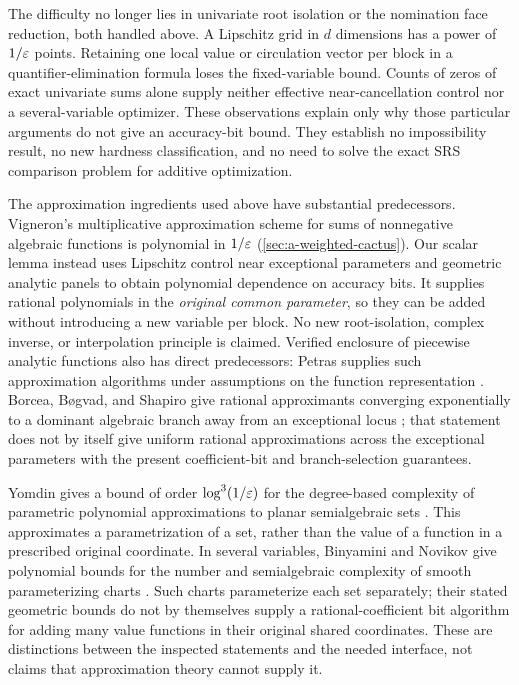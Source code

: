 The difficulty no longer lies in univariate root isolation or the
nomination face reduction, both handled above. A Lipschitz grid in $d$ dimensions
has a power of $1/\varepsilon$ points. Retaining one local value or circulation
vector per block in a quantifier-elimination formula loses the
fixed-variable bound. Counts of zeros of exact univariate sums alone
supply neither effective near-cancellation control nor a
several-variable optimizer. These observations explain only why those
particular arguments do not give an accuracy-bit bound. They establish
no impossibility result, no new hardness classification, and no need
to solve the exact SRS comparison problem for additive optimization.

The approximation ingredients used above have substantial predecessors.
Vigneron's multiplicative approximation scheme for sums of nonnegative
algebraic functions \citep{vigneron2014-geometric-optimization-and-sums-of}
is polynomial in $1/\varepsilon$ (\cref{sec:a-weighted-cactus}). Our scalar lemma
instead uses Lipschitz control near exceptional parameters and geometric
analytic panels to obtain polynomial dependence on accuracy bits. It
supplies rational polynomials in the \emph{original common parameter},
so they can be added without introducing a new variable per block.
No new root-isolation, complex inverse, or interpolation principle is
claimed. Verified enclosure of piecewise analytic functions also has
direct predecessors: Petras supplies such approximation algorithms under
assumptions on the function representation \citep{petras2002-approximation}.
Borcea, B\o gvad, and Shapiro give rational approximants converging
exponentially to a dominant algebraic branch away from an exceptional
locus \citep[Theorems~2--3]{borcea2006-rational-algebraic};
that statement does not by itself give uniform rational approximations
across the exceptional parameters with the present coefficient-bit
and branch-selection guarantees.

Yomdin gives a bound of order $\log^3(1/\varepsilon)$ for the degree-based
complexity of parametric polynomial approximations to planar semialgebraic
sets \citep[Definitions~5.1--5.2 and Theorem~5.6]{yomdin2014-parametrizations}.
This approximates a parametrization of a set, rather than the value of
a function in a prescribed original coordinate. In several variables,
Binyamini and Novikov give polynomial bounds for the number and
semialgebraic complexity of smooth parameterizing charts
\citep[Theorem~1]{binyamini2019-complex-cells}. Such charts parameterize
each set separately; their stated geometric bounds do not by themselves
supply a rational-coefficient bit algorithm for adding many value
functions in their original shared coordinates. These are distinctions
between the inspected statements and the needed interface, not claims
that approximation theory cannot supply it.
